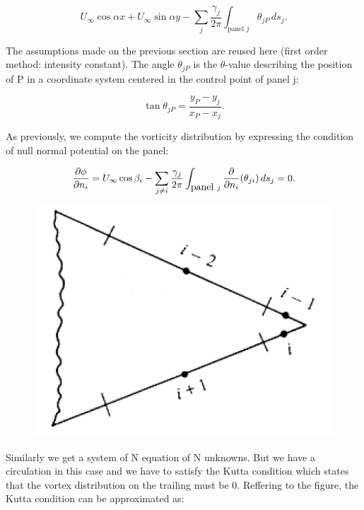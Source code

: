 	\begin{equation}
	U_\infty \cos \alpha x +U_\infty \sin \alpha y - \sum _j \frac{\gamma _j}{2\pi} \int _{\mbox{panel }j} \theta _{jP} \, ds_j.
	\end{equation}
	
	The assumptions made on the previous section are reused here (first order method: intensity constant). The angle $\theta _{jP}$ is the $\theta$-value describing the position of P in a coordinate system centered in the control point of panel j:
	
	\begin{equation}
	\tan \theta _{jP} = \frac{y_P-y_j}{x_P - x_j}.
	\end{equation}
	
	As previously, we compute the vorticity distribution by expressing the condition of null normal potential on the panel:
	
	\begin{equation}
	\frac{\D \phi}{\D n_i} = U_\infty \cos \beta _i - \sum _{j\neq i} \frac{\gamma_j}{2\pi} \int _{\mbox{panel }j} \frac{\D}{\D n_i} (\theta _{ji}) \, ds_j = 0.
	\end{equation}
	
	\begin{figure}
	\vspace{-5mm}
	\includegraphics[scale=0.3]{ch2/43}
	\end{figure}
	Similarly we get a system of N equation of N unknowns. But we have a circulation in this case and we have to satisfy the Kutta condition which states that the vortex distribution on the trailing must be 0. Reffering to the figure, the Kutta condition can be approximated as:
	
